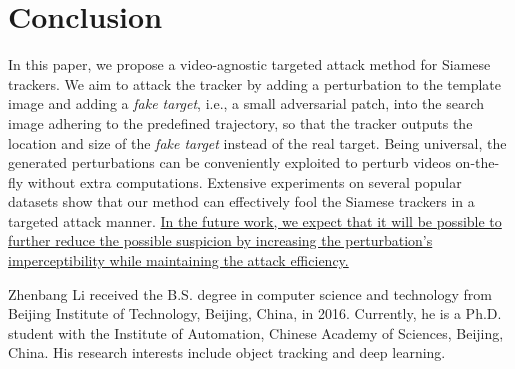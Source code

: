 \documentclass[journal]{IEEEtran}
\newcommand{\ie}{i.e.}
\begin{document}
\section{Conclusion}

In this paper, we propose a video-agnostic targeted attack method for Siamese trackers. 
We aim to attack the tracker by adding a perturbation to the template image and adding a \textit{fake target}, \ie, a small adversarial patch, into the search image adhering to the predefined trajectory, so that the tracker outputs the location and size of the \textit{fake target} instead of the real target. Being universal, the generated perturbations can be conveniently exploited to perturb videos on-the-fly without extra computations.
Extensive experiments on several popular datasets show that our method can effectively fool the Siamese trackers in a targeted attack manner.
\uline{In the future work, we expect that it will be possible to further reduce the possible suspicion by increasing the perturbation's imperceptibility while maintaining the attack efficiency.}

\normalem



\begin{IEEEbiography}
{Zhenbang Li}
received the B.S. degree in computer science and technology from Beijing Institute of Technology, Beijing, China, in 2016. Currently, he is a Ph.D. student with the Institute of Automation, Chinese Academy of Sciences, Beijing, China. His research interests include object tracking and deep learning.
\end{IEEEbiography}
\end{document}
